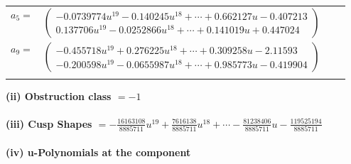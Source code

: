\documentclass[1p]{elsarticle_modified}
\theoremstyle{definition}
\begin{document}
\begin{tabular}{m{7pt} m{180pt} m{7pt} m{180pt} }
\flushright $a_{5}=$&$\begin{pmatrix}-0.0739774 u^{19}-0.140245 u^{18}+\cdots+0.662127 u-0.407213\\0.137706 u^{19}-0.0252866 u^{18}+\cdots+0.141019 u+0.447024\end{pmatrix}$ \\
\flushright $a_{9}=$&$\begin{pmatrix}-0.455718 u^{19}+0.276225 u^{18}+\cdots+0.309258 u-2.11593\\-0.200598 u^{19}-0.0655987 u^{18}+\cdots+0.985773 u-0.419904\end{pmatrix}$\\&\end{tabular}
\flushleft \textbf{(ii) Obstruction class $= -1$}\\~\\
\flushleft \textbf{(iii) Cusp Shapes $= -\frac{16163108}{8885711} u^{19}+\frac{7616138}{8885711} u^{18}+\cdots-\frac{81238406}{8885711} u-\frac{119525194}{8885711}$}\\~\\
\newpage\renewcommand{\arraystretch}{1}
\flushleft \textbf{(iv) u-Polynomials at the component}\newline \\
\end{document}
